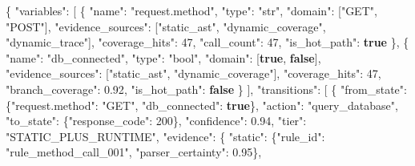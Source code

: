 \documentclass[
]{article}
\newenvironment{Shaded}{}{}
\newcommand{\DataTypeTok}[1]{\textcolor[rgb]{0.56,0.13,0.00}{#1}}
\newcommand{\DecValTok}[1]{\textcolor[rgb]{0.25,0.63,0.44}{#1}}
\newcommand{\FloatTok}[1]{\textcolor[rgb]{0.25,0.63,0.44}{#1}}
\newcommand{\FunctionTok}[1]{\textcolor[rgb]{0.02,0.16,0.49}{#1}}
\newcommand{\KeywordTok}[1]{\textcolor[rgb]{0.00,0.44,0.13}{\textbf{#1}}}
\newcommand{\OtherTok}[1]{\textcolor[rgb]{0.00,0.44,0.13}{#1}}
\newcommand{\StringTok}[1]{\textcolor[rgb]{0.25,0.44,0.63}{#1}}
\begin{document}
\begin{Shaded}
\begin{Highlighting}[]
\FunctionTok{\{}
  \DataTypeTok{"variables"}\FunctionTok{:} \OtherTok{[}
    \FunctionTok{\{}
      \DataTypeTok{"name"}\FunctionTok{:} \StringTok{"request.method"}\FunctionTok{,} \DataTypeTok{"type"}\FunctionTok{:} \StringTok{"str"}\FunctionTok{,} \DataTypeTok{"domain"}\FunctionTok{:} \OtherTok{[}\StringTok{"GET"}\OtherTok{,} \StringTok{"POST"}\OtherTok{]}\FunctionTok{,}
      \DataTypeTok{"evidence\_sources"}\FunctionTok{:} \OtherTok{[}\StringTok{"static\_ast"}\OtherTok{,} \StringTok{"dynamic\_coverage"}\OtherTok{,} \StringTok{"dynamic\_trace"}\OtherTok{]}\FunctionTok{,}
      \DataTypeTok{"coverage\_hits"}\FunctionTok{:} \DecValTok{47}\FunctionTok{,} \DataTypeTok{"call\_count"}\FunctionTok{:} \DecValTok{47}\FunctionTok{,} \DataTypeTok{"is\_hot\_path"}\FunctionTok{:} \KeywordTok{true}
    \FunctionTok{\}}\OtherTok{,}
    \FunctionTok{\{}
      \DataTypeTok{"name"}\FunctionTok{:} \StringTok{"db\_connected"}\FunctionTok{,} \DataTypeTok{"type"}\FunctionTok{:} \StringTok{"bool"}\FunctionTok{,} \DataTypeTok{"domain"}\FunctionTok{:} \OtherTok{[}\KeywordTok{true}\OtherTok{,} \KeywordTok{false}\OtherTok{]}\FunctionTok{,}
      \DataTypeTok{"evidence\_sources"}\FunctionTok{:} \OtherTok{[}\StringTok{"static\_ast"}\OtherTok{,} \StringTok{"dynamic\_coverage"}\OtherTok{]}\FunctionTok{,}
      \DataTypeTok{"coverage\_hits"}\FunctionTok{:} \DecValTok{47}\FunctionTok{,} \DataTypeTok{"branch\_coverage"}\FunctionTok{:} \FloatTok{0.92}\FunctionTok{,} \DataTypeTok{"is\_hot\_path"}\FunctionTok{:} \KeywordTok{false}
    \FunctionTok{\}}
  \OtherTok{]}\FunctionTok{,}
  \DataTypeTok{"transitions"}\FunctionTok{:} \OtherTok{[}
    \FunctionTok{\{}
      \DataTypeTok{"from\_state"}\FunctionTok{:} \FunctionTok{\{}\DataTypeTok{"request.method"}\FunctionTok{:} \StringTok{"GET"}\FunctionTok{,} \DataTypeTok{"db\_connected"}\FunctionTok{:} \KeywordTok{true}\FunctionTok{\},}
      \DataTypeTok{"action"}\FunctionTok{:} \StringTok{"query\_database"}\FunctionTok{,}
      \DataTypeTok{"to\_state"}\FunctionTok{:} \FunctionTok{\{}\DataTypeTok{"response\_code"}\FunctionTok{:} \DecValTok{200}\FunctionTok{\},}
      \DataTypeTok{"confidence"}\FunctionTok{:} \FloatTok{0.94}\FunctionTok{,} \DataTypeTok{"tier"}\FunctionTok{:} \StringTok{"STATIC\_PLUS\_RUNTIME"}\FunctionTok{,}
      \DataTypeTok{"evidence"}\FunctionTok{:} \FunctionTok{\{}
        \DataTypeTok{"static"}\FunctionTok{:} \FunctionTok{\{}\DataTypeTok{"rule\_id"}\FunctionTok{:} \StringTok{"rule\_method\_call\_001"}\FunctionTok{,} \DataTypeTok{"parser\_certainty"}\FunctionTok{:} \FloatTok{0.95}\FunctionTok{\},}

\end{Highlighting}
\end{Shaded}
\end{document}

